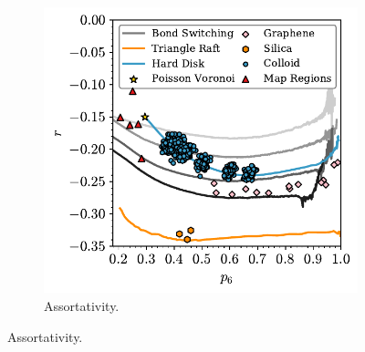 \begin{figure}[bt]
     \centering
     
      \begin{subfigure}[b]{0.45\textwidth}
         \centering
         \includegraphics[width=\textwidth]{./figures/general_networks/gen_assort.pdf}
         \caption{Assortativity.}
         \label{fig:assortgena}
     \end{subfigure}
     \hfill
     

\end{figure}
